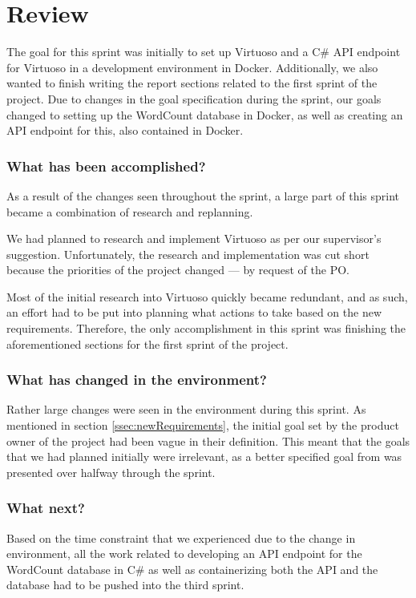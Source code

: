 \section{Review}
The goal for this sprint was initially to set up Virtuoso and a C\# API endpoint for Virtuoso in a development environment in Docker. 
Additionally, we also wanted to finish writing the report sections related to the first sprint of the \knox{} project. 
Due to changes in the goal specification during the sprint, our goals changed to setting up the WordCount database in Docker, as well as creating an API endpoint for this, also contained in Docker.

\subsubsection*{What has been accomplished?}
As a result of the changes seen throughout the sprint, a large part of this sprint became a combination of research and replanning. 

We had planned to research and implement Virtuoso as per our supervisor's suggestion.
Unfortunately, the research and implementation was cut short because the priorities of the \knox{} project changed --- by request of the \knox{} PO.

Most of the initial research into Virtuoso quickly became redundant, and as such, an effort had to be put into planning what actions to take based on the new requirements. 
Therefore, the only accomplishment in this sprint was finishing the aforementioned sections for the first sprint of the \knox{} project.  



\subsubsection*{What has changed in the environment?}
Rather large changes were seen in the environment during this sprint. As mentioned in section \ref{ssec:newRequirements}, the initial goal set by the product owner of the \knox{} project had been vague in their definition. 
This meant that the goals that we had planned initially were irrelevant, as a better specified goal from \knox{} was presented over halfway through the sprint. 

\subsubsection*{What next?}
Based on the time constraint that we experienced due to the change in environment, all the work related to developing an API endpoint for the WordCount database in C\# as well as containerizing both the API and the database had to be pushed into the third sprint.
